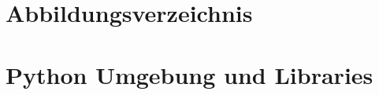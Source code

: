 \documentclass[a4paper,12pt,oneside,BCOR=0mm,bibliography=totoc,parskip=half]{vwa}
\begin{document}
% 

\renewcommand{\bibname}{Literaturverzeichnis}
\newpage




\chapter*{Abbildungsverzeichnis}\label{chapter:Abbildungsverzeichnis}


% 

\chapter*{Python Umgebung und Libraries}\label{chapter:Python Umgebung und Libraries}




\end{document}
